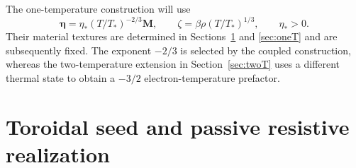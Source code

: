 \documentclass[11pt,a4paper]{article}
\theoremstyle{remark}\newtheorem{remark}{Remark}
\numberwithin{equation}{section}
\newcommand{\MM}{\boldsymbol M}
\newcommand{\etab}{\boldsymbol\eta}
\begin{document}
The one-temperature construction will use
\begin{equation}
\etab=\eta_*(T/T_*)^{-2/3}\MM,\qquad
\zeta=\beta\rho(T/T_*)^{1/3},\qquad \eta_*>0.
\label{eq:oneclosures}
\end{equation}
Their material textures are determined in Sections~\ref{sec:realization} and \ref{sec:oneT} and are subsequently fixed. The exponent $-2/3$ is selected by the coupled construction, whereas the two-temperature extension in Section~\ref{sec:twoT} uses a different thermal state to obtain a $-3/2$ electron-temperature prefactor.


\section{Toroidal seed and passive resistive realization}\label{sec:realization}
\end{document}
